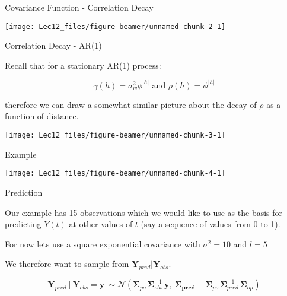 \documentclass[11pt,ignorenonframetext,]{beamer}
\begin{document}
\begin{frame}{Covariance Function - Correlation Decay}
\protect\hypertarget{covariance-function---correlation-decay}{}

\begin{center}\texttt{[image: Lec12\_files/figure-beamer/unnamed-chunk-2-1]} \end{center}

\end{frame}

\begin{frame}{Correlation Decay - AR(1)}
\protect\hypertarget{correlation-decay---ar1}{}

Recall that for a stationary AR(1) process:

\[\gamma(h) = \sigma^2_w \phi^{|h|} \text{ and } \rho(h) = \phi^{|h|}\]

therefore we can draw a somewhat similar picture about the decay of
\(\rho\) as a function of distance.

\begin{center}\texttt{[image: Lec12\_files/figure-beamer/unnamed-chunk-3-1]} \end{center}

\end{frame}

\begin{frame}{Example}
\protect\hypertarget{example}{}

\begin{center}\texttt{[image: Lec12\_files/figure-beamer/unnamed-chunk-4-1]} \end{center}

\end{frame}

\begin{frame}[t]{Prediction}
\protect\hypertarget{prediction}{}

Our example has 15 observations which we would like to use as the basis
for predicting \(Y(t)\) at other values of \(t\) (say a sequence of
values from 0 to 1).

\vspace{3mm}

\pause

For now lets use a square exponential covariance with \(\sigma^2 = 10\)
and \(l=5\)

\vspace{3mm}

\pause

We therefore want to sample from \(\symbf{Y}_{pred} | \symbf{Y}_{obs}\).

\[\symbf{Y}_{pred} ~|~ \symbf{Y}_{obs} = \symbf{y} ~\sim \mathcal{N}(\symbf{\Sigma}_{po} \, \symbf{\Sigma}_{obs}^{-1} \, \symbf{y},~ \symbf{\Sigma_{pred}}-\symbf{\Sigma}_{po}\,\symbf{\Sigma}_{pred}^{-1} \, \symbf{\Sigma}_{op})\]

\end{frame}
\end{document}

